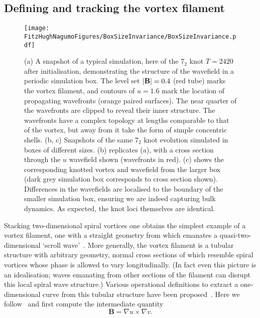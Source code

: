\subsection{Defining and tracking the vortex filament}
\label{subsec:DefiningTracking}
\begin{figure}[htbp]
    \texttt{[image: \\FitzHughNagumoFigures/BoxSizeInvariance/BoxSizeInvariance.pdf]}
    \caption[A typical simulation of knotted vortices in the FitzHugh-Nagumo model.]{\label{fig:TypicalSimulation} (a) A snapshot of a typical simulation, here of the $7_2$ knot $T=2420$ after initialisation, demonstrating the structure of the wavefield in a periodic simulation box. The level set $|{\bf B}|=0.4$ (red tube) marks the vortex filament, and contours of $ u = 1.6$ mark the location of propagating wavefronts (orange paired surfaces). The near quarter of the wavefronts are clipped to reveal their inner structure. The wavefronts have a complex topology at lengths comparable to that of the vortex, but away from it take the form of simple concentric shells. (b, c) Snapshots of the same $7_2$ knot evolution simulated in boxes of different sizes. (b) replicates (a), with a cross section through the $u$ wavefield shown (wavefronts in red). (c) shows the corresponding knotted vortex and wavefield from the larger box (dark grey simulation box corresponds to cross section shown). Differences in the wavefields are localised to the boundary of the smaller simulation box, ensuring we are indeed capturing bulk dynamics. As expected, the knot loci themselves are identical.}
\end{figure}
Stacking two-dimensional spiral vortices one obtains the simplest example of a vortex filament, one with a straight geometry from which emanates a quasi-two-dimensional `scroll wave'~\citep{Winfree1983}. More generally, the vortex filament is a tubular structure with arbitrary geometry, normal cross sections of which resemble spiral vortices whose phase is allowed to vary longitudinally. (In fact even this picture is an idealisation; waves emanating from other sections of the filament can disrupt this local spiral wave structure.) Various operational definitions to extract a one-dimensional curve from this tubular structure have been proposed~\citep{Winfree1990,Henze1993,Dowle1997}. Here we follow~\citep{Sutcliffe2003,Maucher2016,Maucher2017,Maucher2018,Maucher2019} and first compute the intermediate quantity
\begin{equation}
\label{eq:ucrossv}
\mathbf{B} = \nabla u \times \nabla v.
\end{equation}
